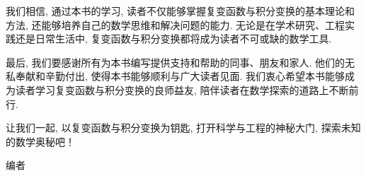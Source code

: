 我们相信, 通过本书的学习, 读者不仅能够掌握复变函数与积分变换的基本理论和方法, 还能够培养自己的数学思维和解决问题的能力. 无论是在学术研究、工程实践还是日常生活中, 复变函数与积分变换都将成为读者不可或缺的数学工具. 

最后, 我们要感谢所有为本书编写提供支持和帮助的同事、朋友和家人. 他们的无私奉献和辛勤付出, 使得本书能够顺利与广大读者见面. 我们衷心希望本书能够成为读者学习复变函数与积分变换的良师益友, 陪伴读者在数学探索的道路上不断前行. 

让我们一起, 以复变函数与积分变换为钥匙, 打开科学与工程的神秘大门, 探索未知的数学奥秘吧！

\vskip 0.5cm
\begin{flushright}
编者\\
\zhtoday
\end{flushright}


\tableofcontents


